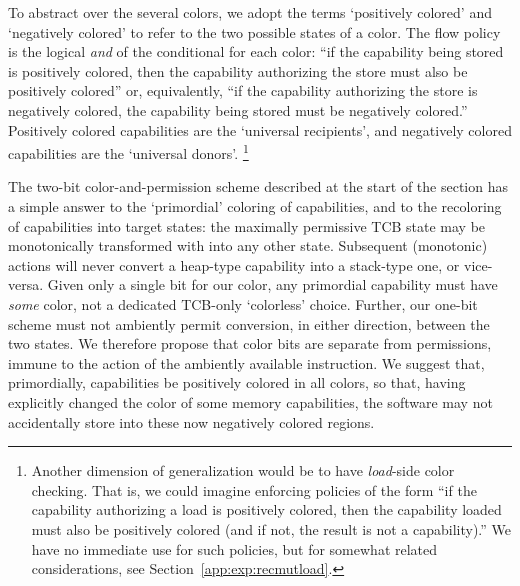 To abstract over the several colors, we adopt the terms `positively colored' and
`negatively colored' to refer to the two possible states of a color.  The flow
policy is the logical \emph{and}
of the conditional for each color: ``if the
capability being stored is positively colored, then the capability authorizing the
store must also be positively colored'' or, equivalently, ``if the capability
authorizing the store is negatively colored, the capability being stored must be
negatively colored.''  Positively colored capabilities are the `universal
recipients', and
negatively colored capabilities are the `universal donors'.%
%
\footnote{Another dimension of generalization would be to have
\emph{load}-side color checking.  That is, we could imagine enforcing
policies of the form ``if the capability authorizing a load is positively colored, then
the capability loaded must also be positively colored (and if not, the result is not a
capability).''  We have no immediate use for such policies, but for somewhat
related considerations, see Section~\ref{app:exp:recmutload}.}

The two-bit color-and-permission scheme described at the start of the
section has a simple answer to the `primordial' coloring of capabilities,
and to the recoloring of capabilities into target states: the
maximally permissive TCB state may be monotonically transformed with
 into any other state.  Subsequent (monotonic)
actions will never convert a heap-type capability into a stack-type one, or
vice-versa.  Given only a single bit for our color, any primordial
capability must have \emph{some} color, not a dedicated TCB-only
`colorless' choice.  Further, our one-bit scheme must not ambiently permit
conversion, in either direction, between the two states.  We therefore
propose that color bits are separate from permissions, immune to the action
of the ambiently available  instruction.  We suggest
that, primordially, capabilities be positively colored in all colors, so that, having
explicitly changed the color of some memory capabilities, the software may
not accidentally store into these now negatively colored regions.

